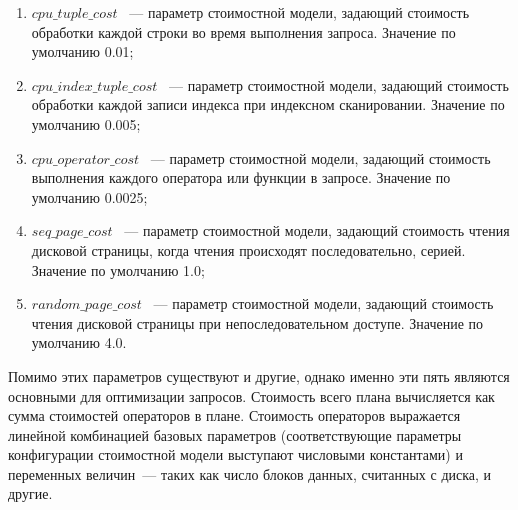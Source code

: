 \begin{enumerate}
    \item \(cpu\_tuple\_cost\) ~--- параметр стоимостной модели, задающий стоимость обработки каждой строки во время выполнения запроса. Значение по умолчанию 0.01;
    \item \(cpu\_index\_tuple\_cost\) ~--- параметр стоимостной модели, задающий стоимость обработки каждой записи индекса при индексном сканировании. Значение по умолчанию 0.005;
    \item \(cpu\_operator\_cost\) ~--- параметр стоимостной модели, задающий стоимость выполнения каждого оператора или функции в запросе. Значение по умолчанию 0.0025;
    \item \(seq\_page\_cost\) ~--- параметр стоимостной модели, задающий стоимость чтения дисковой страницы, когда чтения происходят последовательно, серией. Значение по умолчанию 1.0;
    \item \(random\_page\_cost\) ~--- параметр стоимостной модели, задающий стоимость чтения дисковой страницы при непоследовательном доступе. Значение по умолчанию 4.0.
\end{enumerate}

Помимо этих параметров существуют и другие, однако именно эти пять являются основными для оптимизации запросов. Стоимость всего плана вычисляется как сумма стоимостей операторов в плане. Стоимость операторов выражается линейной комбинацией базовых параметров (соответствующие параметры конфигурации стоимостной модели выступают числовыми константами) и переменных величин~--- таких как число блоков данных, считанных с диска, и другие.

